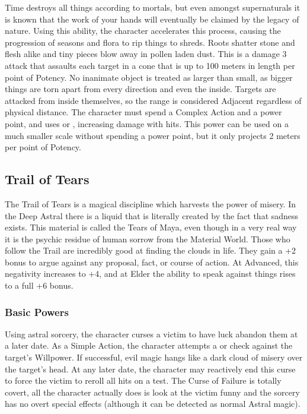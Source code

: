  Time destroys all things according to mortals, but even amongst supernaturals it is known that the work of your hands will eventually be claimed by the legacy of nature. Using this ability, the character accelerates this process, causing the progression of seasons and flora to rip things to shreds. Roots shatter stone and flesh alike and tiny pieces blow away in pollen laden dust. This is a damage 3 attack that assaults each target in a cone that is up to 100 meters in length per point of Potency. No inanimate object is treated as larger than small, as bigger things are torn apart from every direction and even the inside. Targets are attacked from inside themselves, so the range is considered Adjacent regardless of physical distance. The character must spend a Complex Action and a power point, and uses  or , increasing damage with hits. This power can be used on a much smaller scale without spending a power point, but it only projects 2 meters per point of Potency.


\subsection{Trail of Tears}

The Trail of Tears is a magical discipline which harvests the power of misery. In the Deep Astral there is a liquid that is literally created by the fact that sadness exists. This material is called the Tears of Maya, even though in a very real way it is the psychic residue of human sorrow from the Material World. Those who follow the Trail are incredibly good at finding the clouds in life. They gain a +2 bonus to argue against any proposal, fact, or course of action. At Advanced, this negativity increases to +4, and at Elder the ability to speak against things rises to a full +6 bonus.

\subsubsection{Basic Powers}

 Using astral sorcery, the character curses a victim to have luck abandon them at a later date. As a Simple Action, the character attempts a  or  check against the target's Willpower. If successful, evil magic hangs like a dark cloud of misery over the target's head. At any later date, the character may reactively end this curse to force the victim to reroll all hits on a test. The Curse of Failure is totally covert, all the character actually does is look at the victim funny and the sorcery has no overt special effects (although it can be detected as normal Astral magic).

